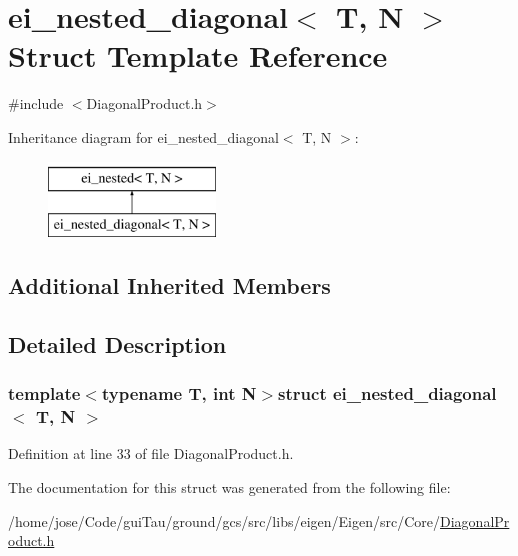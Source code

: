 \hypertarget{structei__nested__diagonal}{\section{ei\-\_\-nested\-\_\-diagonal$<$ T, N $>$ Struct Template Reference}
\label{structei__nested__diagonal}
}


{\ttfamily \#include $<$Diagonal\-Product.\-h$>$}

Inheritance diagram for ei\-\_\-nested\-\_\-diagonal$<$ T, N $>$\-:\begin{figure}[H]
\begin{center}
\leavevmode
\includegraphics[height=2.000000cm]{structei__nested__diagonal}
\end{center}
\end{figure}
\subsection*{Additional Inherited Members}


\subsection{Detailed Description}
\subsubsection*{template$<$typename T, int N$>$struct ei\-\_\-nested\-\_\-diagonal$<$ T, N $>$}



Definition at line 33 of file Diagonal\-Product.\-h.



The documentation for this struct was generated from the following file\-:\begin{DoxyCompactItemize}
\item 
/home/jose/\-Code/gui\-Tau/ground/gcs/src/libs/eigen/\-Eigen/src/\-Core/\hyperlink{_diagonal_product_8h}{Diagonal\-Product.\-h}\end{DoxyCompactItemize}

